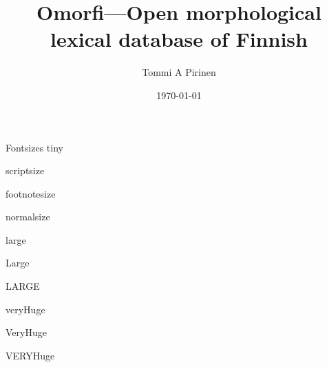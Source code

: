 \documentclass{beamer}
\title[Omorfi]{Omorfi---Open morphological lexical database of Finnish}
\author[tommi.pirinen@computing.dcu.ie]{Tommi A Pirinen}
\institute[DCU]{Ollscoil Chathair Bhaile Átha Cliath}
\date{\today}
\begin{document}
  \begin{frame}{}
      \maketitle
    \vfill
    \begin{block}{\large Fontsizes}
      \centering
      {\tiny tiny}\par
      {\scriptsize scriptsize}\par
      {\footnotesize footnotesize}\par
      {\normalsize normalsize}\par
      {\large large}\par
      {\Large Large}\par
      {\LARGE LARGE}\par
      {\veryHuge veryHuge}\par
      {\VeryHuge VeryHuge}\par
      {\VERYHuge VERYHuge}\par
    \end{block}
    \vfill
  \end{frame}
\end{document}
